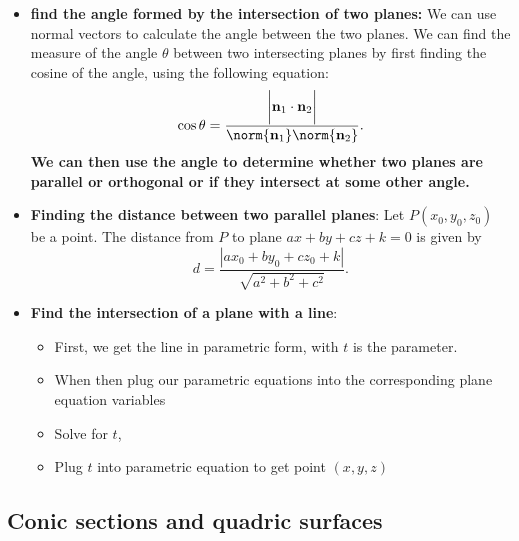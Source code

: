 \documentclass{report}
\begin{document}
\begin{itemize}
\begin{itemize}
        \end{itemize}
    \item \textbf{find the angle formed by the intersection of two planes:} We can use normal vectors to calculate the angle between the two planes.
        \bigbreak \noindent 
        We can find the measure of the angle $\theta$ between two intersecting planes by first finding the cosine of the angle, using the following equation:
        \begin{align*}
            \cos{\theta }= \frac{\bigg\lvert \mathbf{n}_{1} \cdot \mathbf{n}_{2} \bigg\rvert}{\norm{\mathbf{n}_{1}}\norm{\mathbf{n}_{2}}}
        .\end{align*}
        \textbf{We can then use the angle to determine whether two planes are parallel or orthogonal or if they intersect at some other angle.}
        \pagebreak 
    \item \textbf{Finding the distance between two parallel planes}: 
        Let $P(x_0, y_0, z_0)$ be a point. The distance from $P$ to plane $ax + by + cz + k = 0$ is given by
        \[
            d = \frac{\left| ax_0 + by_0 + cz_0 + k \right|}{\sqrt{a^2 + b^2 + c^2}}.
        \]
    \item \textbf{Find the intersection of a plane with a line}:
        \begin{itemize}
            \item First, we get the line in parametric form, with $t$ is the parameter.
            \item When then plug our parametric equations into the corresponding plane equation variables
            \item Solve for $t$,
            \item Plug $t$ into parametric equation to get point $(x,y,z)$
        \end{itemize}

    \end{itemize}
    \pagebreak 
    \subsection{Conic sections and quadric surfaces}
    \bigbreak \noindent 
\end{document}
